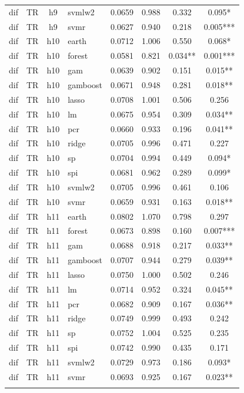 \begin{ThreePartTable}
\begin{longtable}[t]{llclcccc}
dif & TR & h9 & svmlw2 & 0.0659 & 0.988 & 0.332 & 0.095*\\
dif & TR & h9 & svmr & 0.0627 & 0.940 & 0.218 & 0.005***\\
\addlinespace
dif & TR & h10 & earth & 0.0712 & 1.006 & 0.550 & 0.068*\\
dif & TR & h10 & forest & 0.0581 & 0.821 & 0.034** & 0.001***\\
dif & TR & h10 & gam & 0.0639 & 0.902 & 0.151 & 0.015**\\
dif & TR & h10 & gamboost & 0.0671 & 0.948 & 0.281 & 0.018**\\
dif & TR & h10 & lasso & 0.0708 & 1.001 & 0.506 & 0.256\\
dif & TR & h10 & lm & 0.0675 & 0.954 & 0.309 & 0.034**\\
dif & TR & h10 & pcr & 0.0660 & 0.933 & 0.196 & 0.041**\\
dif & TR & h10 & ridge & 0.0705 & 0.996 & 0.471 & 0.227\\
dif & TR & h10 & sp & 0.0704 & 0.994 & 0.449 & 0.094*\\
dif & TR & h10 & spi & 0.0681 & 0.962 & 0.289 & 0.099*\\
dif & TR & h10 & svmlw2 & 0.0705 & 0.996 & 0.461 & 0.106\\
dif & TR & h10 & svmr & 0.0659 & 0.931 & 0.163 & 0.018**\\
\addlinespace
dif & TR & h11 & earth & 0.0802 & 1.070 & 0.798 & 0.297\\
dif & TR & h11 & forest & 0.0673 & 0.898 & 0.160 & 0.007***\\
dif & TR & h11 & gam & 0.0688 & 0.918 & 0.217 & 0.033**\\
dif & TR & h11 & gamboost & 0.0707 & 0.944 & 0.279 & 0.039**\\
dif & TR & h11 & lasso & 0.0750 & 1.000 & 0.502 & 0.246\\
dif & TR & h11 & lm & 0.0714 & 0.952 & 0.324 & 0.045**\\
dif & TR & h11 & pcr & 0.0682 & 0.909 & 0.167 & 0.036**\\
dif & TR & h11 & ridge & 0.0749 & 0.999 & 0.493 & 0.242\\
dif & TR & h11 & sp & 0.0752 & 1.004 & 0.525 & 0.235\\
dif & TR & h11 & spi & 0.0742 & 0.990 & 0.435 & 0.171\\
dif & TR & h11 & svmlw2 & 0.0729 & 0.973 & 0.186 & 0.093*\\
dif & TR & h11 & svmr & 0.0693 & 0.925 & 0.167 & 0.023**\\
\addlinespace

\end{longtable}
\end{ThreePartTable}
